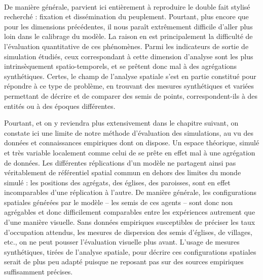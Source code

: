 \bigskip
\paragraph[Conclusion intermédiaire]{}
De manière générale, \simfeodal{} parvient ici entièrement à reproduire le double fait stylisé recherché : fixation et dissémination du peuplement.
Pourtant, plus encore que pour les dimensions précédentes, il nous paraît extrêmement difficile d'aller plus loin dans le calibrage du modèle.
La raison en est principalement la difficulté de l'évaluation quantitative de ces phénomènes.
Parmi les indicateurs de sortie de simulation étudiés, ceux correspondant à cette dimension d'analyse sont les plus intrinsèquement spatio-temporels, et se prêtent donc mal à des agrégations synthétiques.
Certes, le champ de l'analyse spatiale s'est en partie constitué pour répondre à ce type de problème, en trouvant des mesures synthétiques et variées permettant de décrire et de comparer des semis de points, correspondent-ils à des entités ou à des époques différentes.

Pourtant, et on y reviendra plus extensivement dans le chapitre suivant, on constate ici une limite de notre méthode d'évaluation des simulations, au vu des données et connaissances empiriques dont on dispose.
Un espace théorique, simulé et très variable localement comme celui de \simfeodal{} se prête en effet mal à une agrégation de données.
Les différentes réplications d'un modèle ne partagent ainsi pas véritablement de référentiel spatial commun en dehors des limites du monde simulé : les positions des agrégats, des églises, des paroisses, sont en effet incomparables d'une réplication à l'autre.
De manière générale, les configurations spatiales générées par le modèle -- les semis de ces agents -- sont donc non agrégables et donc difficilement comparables entre les expériences autrement que d'une manière visuelle.
Sans données empiriques susceptibles de préciser les taux d'occupation attendus, les mesures de dispersion des semis d'églises, de villages, etc., on ne peut pousser l'évaluation visuelle plus avant.
L'usage de mesures synthétiques, tirées de l'analyse spatiale, pour décrire ces configurations spatiales serait de plus peu adapté puisque ne reposant pas sur des sources empiriques suffisamment précises.


